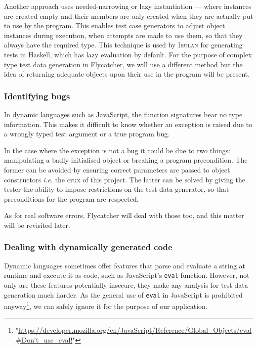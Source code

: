Another approach uses needed-narrowing \cite{antoy1994needed} or lazy instantiation \cite{lindblad2007property} --- where instances are created empty and their members are only created when they are actually put to use by the program. This enables test case generators to adjust object instances during execution, when attempts are made to use them, so that they always have the required type. This technique is used by \textsc{Irulan} \cite{allwood2011high} for generating tests in Haskell, which has lazy evaluation by default. For the purpose of complex type test data generation in \textsf{Flycatcher}, we will use a different method but the idea of returning adequate objects upon their use in the program will be present.

\subsubsection{Identifying bugs}

In dynamic languages such as JavaScript, the function signatures bear no type information. This makes it difficult to know whether an exception is raised due to a wrongly typed test argument or a true program bug.

In the case where the exception is not a bug it could be due to two things: manipulating a badly initialised object or breaking a program precondition. The former can be avoided by ensuring correct parameters are passed to object constructors \emph{i.e.} the crux of this project. The latter can be solved by giving the tester the ability to impose restrictions on the test data generator, so that preconditions for the program are respected.

As for real software errors, \textsf{Flycatcher} will deal with those too, and this matter will be revisited later.

\subsubsection{Dealing with dynamically generated code}

Dynamic languages sometimes offer features that parse and evaluate a string at runtime and execute it as code, such as JavaScript's \texttt{eval} function. However, not only are these features potentially insecure, they make any analysis for test data generation much harder. As the general use of \texttt{eval} in JavaScript is prohibited anyway\footnote{\tiny"\url{https://developer.mozilla.org/en/JavaScript/Reference/Global_Objects/eval#Don't_use_eval!}"}, we can safely ignore it for the purpose of our application.

